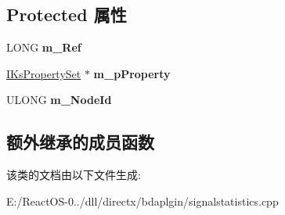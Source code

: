 \subsection*{Protected 属性}
\begin{DoxyCompactItemize}
\item 
\mbox{\label{class_c_b_d_a_signal_statistics_a31ee0555598e9df6f2d8e069fa2ef98f}} 
L\+O\+NG {\bfseries m\+\_\+\+Ref}
\item 
\mbox{\label{class_c_b_d_a_signal_statistics_a1db0f0b776331608ee82131747853d11}} 
\hyperlink{interface_i_ks_property_set}{I\+Ks\+Property\+Set} $\ast$ {\bfseries m\+\_\+p\+Property}
\item 
\mbox{\label{class_c_b_d_a_signal_statistics_a216ac16422f106c9d86749316272bd80}} 
U\+L\+O\+NG {\bfseries m\+\_\+\+Node\+Id}
\end{DoxyCompactItemize}
\subsection*{额外继承的成员函数}


该类的文档由以下文件生成\+:\begin{DoxyCompactItemize}
\item 
E\+:/\+React\+O\+S-\/0../dll/directx/bdaplgin/signalstatistics.\+cpp\end{DoxyCompactItemize}
